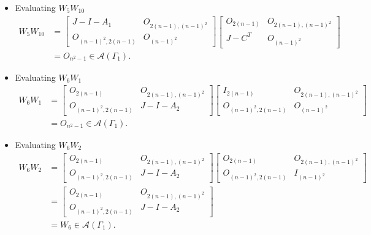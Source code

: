 \begin{itemize}
    \item Evaluating $W_5W_{10}$
    \begin{align*}
        W_5W_{10}
        &= \begin{bmatrix}
            J-I-A_1 & O_{2(n-1), (n-1)^2} \\
            O_{(n-1)^2, 2(n-1)} & O_{(n-1)^2}
        \end{bmatrix}\begin{bmatrix}
            O_{2(n-1)} & O_{2(n-1), (n-1)^2} \\
            J-C^T & O_{(n-1)^2}
        \end{bmatrix}\\
        &= O_{n^2-1}\in\mathcal{A}(\Gamma_1).
    \end{align*}
    
    \item Evaluating $W_6W_1$
    \begin{align*}
        W_6W_1
        &= \begin{bmatrix}
            O_{2(n-1)} & O_{2(n-1), (n-1)^2} \\
            O_{(n-1)^2, 2(n-1)} & J-I-A_2
        \end{bmatrix}\begin{bmatrix}
            I_{2(n-1)} & O_{2(n-1), (n-1)^2} \\
            O_{(n-1)^2, 2(n-1)} & O_{(n-1)^2}
        \end{bmatrix}\\
        &= O_{n^2-1}\in\mathcal{A}(\Gamma_1).
    \end{align*}
    
    \item Evaluating $W_6W_2$
    \begin{align*}
        W_6W_2
        &= \begin{bmatrix}
            O_{2(n-1)} & O_{2(n-1), (n-1)^2} \\
            O_{(n-1)^2, 2(n-1)} & J-I-A_2
        \end{bmatrix}\begin{bmatrix}
            O_{2(n-1)} & O_{2(n-1), (n-1)^2} \\
            O_{(n-1)^2, 2(n-1)} & I_{(n-1)^2}
        \end{bmatrix}\\
        &= \begin{bmatrix}
            O_{2(n-1)} & O_{2(n-1), (n-1)^2} \\
            O_{(n-1)^2, 2(n-1)} & J-I-A_2
        \end{bmatrix}\\
        &=W_6\in\mathcal{A}(\Gamma_1).
    \end{align*}
    

\end{itemize}
